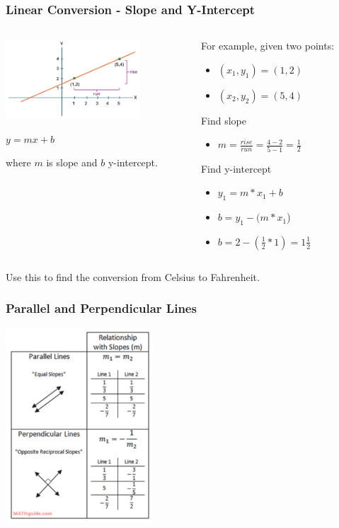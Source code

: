 \documentclass{beamer}
\begin{document}
\begin{frame}\frametitle{Linear Conversion - Slope and Y-Intercept}
\begin{columns}
\begin{column}{6cm}
\begin{center}
\includegraphics[width=5cm]{fig/slope.jpg}

$y = mx + b$

where $m$ is slope and $b$ y-intercept. 
\end{center}
\end{column}

\begin{column}{5.2cm}
For example, given two points:
\begin{itemize}
\item $(x_1,y_1) = (1,2)$
\item $(x_2,y_2) = (5,4)$
\end{itemize}
Find slope
\begin{itemize}
\item $m = \frac{rise}{run} = \frac{4-2}{5-1} = \frac{1}{2}$
\end{itemize}
Find y-intercept
\begin{itemize}
\item $y_1 = m * x_1 + b$
\item $b = y_1 - (m * x_1$)
\item $b = 2 - (\frac{1}{2} * 1) = 1 \frac{1}{2}$
\end{itemize}
\end{column}
\end{columns}

\vspace{1cm}

Use this to find the conversion from Celsius to Fahrenheit.
\end{frame}

\begin{frame}\frametitle{Parallel and Perpendicular Lines}
\begin{center}
\includegraphics[width=5.5cm]{fig/parperp.jpg}
\end{center}
\end{frame}
\end{document}
